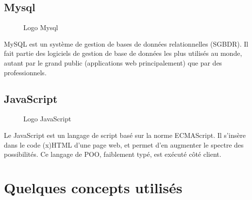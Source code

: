 \subsection{Mysql}
\begin{figure}[H]
    \centering
    \caption{Logo Mysql}
\end{figure}
MySQL est un système de gestion de bases de données relationnelles (SGBDR).  Il fait partie des logiciels de gestion de base de données les plus utilisés au monde, autant par le grand public (applications web principalement) que par des professionnels.
\subsection{JavaScript}
\begin{figure}[H]
    \centering
    \caption{Logo JavaScript}
\end{figure}
Le JavaScript est un langage de script basé sur la norme ECMAScript.
Il s'insère dans le code (x)HTML d'une page web, et permet d'en augmenter le spectre des possibilités.
Ce langage de POO, faiblement typé, est exécuté côté client.

\newpage

\section{Quelques concepts utilisés}
